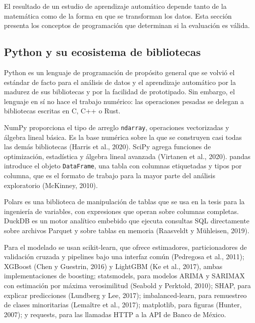 El resultado de un estudio de aprendizaje automático depende tanto de la matemática como de la forma en que se transforman los datos. Esta sección presenta los conceptos de programación que determinan si la evaluación es válida.

\subsection{Python y su ecosistema de bibliotecas}
Python es un lenguaje de programación de propósito general que se volvió el estándar de facto para el análisis de datos y el aprendizaje automático por la madurez de sus bibliotecas y por la facilidad de prototipado. Sin embargo, el lenguaje en sí no hace el trabajo numérico: las operaciones pesadas se delegan a bibliotecas escritas en C, C++ o Rust. %

NumPy proporciona el tipo de arreglo \texttt{ndarray}, operaciones vectorizadas y álgebra lineal básica. Es la base numérica sobre la que se construyen casi todas las demás bibliotecas (Harris et al., 2020). SciPy agrega funciones de optimización, estadística y álgebra lineal avanzada (Virtanen et al., 2020). pandas introduce el objeto \texttt{DataFrame}, una tabla con columnas etiquetadas y tipos por columna, que es el formato de trabajo para la mayor parte del análisis exploratorio (McKinney, 2010).

Polars es una biblioteca de manipulación de tablas que se usa en la tesis para la ingeniería de variables, con expresiones que operan sobre columnas completas. DuckDB es un motor analítico embebido que ejecuta consultas SQL directamente sobre archivos Parquet y sobre tablas en memoria (Raasveldt y Mühleisen, 2019). %

Para el modelado se usan scikit-learn, que ofrece estimadores, particionadores de validación cruzada y pipelines bajo una interfaz común (Pedregosa et al., 2011); XGBoost (Chen y Guestrin, 2016) y LightGBM (Ke et al., 2017), ambas implementaciones de boosting; statsmodels, para modelos ARIMA y SARIMAX con estimación por máxima verosimilitud (Seabold y Perktold, 2010); SHAP, para explicar predicciones (Lundberg y Lee, 2017); imbalanced-learn, para remuestreo de clases minoritarias (Lemaître et al., 2017); matplotlib, para figuras (Hunter, 2007); y requests, para las llamadas HTTP a la API de Banco de México. %

